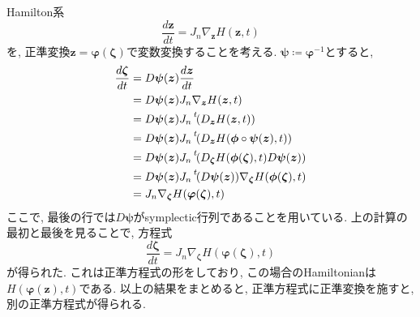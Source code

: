 \documentclass{ltjsarticle}
\theoremstyle{definition}
\numberwithin{thm}{section}
\theoremstyle{definition}
\numberwithin{prop}{section}
\theoremstyle{definition}
\numberwithin{dfn}{section}
\numberwithin{equation}{section}
\begin{document}
Hamilton系
\begin{equation}
    \frac{d\bm{z}}{dt}=J_n{\nabla}_{\bm{z}} H(\bm{z},t)
\end{equation}
を, 正準変換$\bm{z}=\bm{\varphi}\left(\bm{\zeta}\right)$で変数変換することを考える. $\bm{\psi}\coloneq\bm{\varphi}^{-1}$とすると,
\begin{equation*}
    \begin{aligned}
        \frac{d\bm{\zeta}}{dt} &= D\bm{\psi}(\bm{z})\frac{d\bm{z}}{dt}\\
        &= D\bm{\psi}(\bm{z})J_n\nabla_{\bm{z}}H(\bm{z},t)\\
        &= D\bm{\psi}(\bm{z})J_n\prescript{t\!}{}{(D_{\bm{z}}H(\bm{z},t))}\\
        &= D\bm{\psi}(\bm{z})J_n\prescript{t\!}{}{(D_{\bm{z}}H(\bm{\phi}\circ\bm{\psi}(\bm{z}),t))}\\
        &=D\bm{\psi}(\bm{z})J_n\prescript{t\!}{}{(D_{\bm{\zeta}}H(\bm{\phi}(\bm{\zeta}),t)D\bm{\psi}(\bm{z}))}\\
       &=D\bm{\psi}(\bm{z})J_n\prescript{t\!}{}{(D{\bm{\psi}}(\bm{z}))}\nabla_{\bm{\zeta}}H(\bm{\phi}(\bm{\zeta}),t)\\
        &=J_n\nabla_{\bm{\zeta}}H(\bm{\varphi}(\bm{\zeta}),t)\\
    \end{aligned}
\end{equation*}
ここで, 最後の行では$D\bm{\psi}$がsymplectic行列であることを用いている. 上の計算の最初と最後を見ることで, 方程式
\begin{equation}
    \frac{d\bm{\zeta}}{dt}=J_n\nabla_{\bm{\zeta}}H(\bm{\varphi}(\bm{\zeta}),t)
\end{equation}
が得られた. これは正準方程式の形をしており, この場合のHamiltonianは$H(\bm{\varphi}(\bm{z}),t)$である.
以上の結果をまとめると, 正準方程式に正準変換を施すと, 別の正準方程式が得られる.
\end{document}
